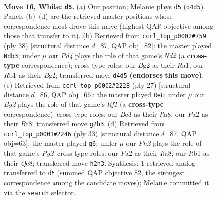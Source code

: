 \documentclass[11pt]{article}
\begin{document}
\clearpage

\begin{figure}[p]\centering
\begin{subfigure}{0.46\textwidth}\centering
\resizebox{\linewidth}{!}{%
\newchessgame
\chessboard[
  setfen={rnb1q1k1/pp2r1pp/2p1p3/4Np1n/2PP4/2B1P1P1/P4PBP/1R1QR1K1 w - - 1 16},
  showmover=false,
  pgfstyle=straightmove, color=movearrow, markmove={d4-d5}
]}
\caption{}
\end{subfigure}\hfill
\begin{subfigure}{0.46\textwidth}\centering
\resizebox{\linewidth}{!}{%
\newchessgame
\chessboard[
  setfen={rnbqr1k1/6pp/2p1pp2/p1N2n2/Pp1P4/6P1/2QNPPBP/R4RK1 w - - 8 20},
  showmover=false,
  pgfstyle=straightmove, color=movearrow, markmove={d2-b3}
]}
\caption{}
\end{subfigure}
\\[4pt]
\begin{subfigure}{0.46\textwidth}\centering
\resizebox{\linewidth}{!}{%
\newchessgame
\chessboard[
  setfen={r1bq1rk1/pp4bp/2ppp1p1/5p2/2PPn3/BP3NP1/P1Q1PPBP/R2R2K1 b - - 4 14},
  showmover=false,
  pgfstyle=straightmove, color=movearrow, markmove={f8-e8}
]}
\caption{}
\end{subfigure}\hfill
\begin{subfigure}{0.46\textwidth}\centering
\resizebox{\linewidth}{!}{%
\newchessgame
\chessboard[
  setfen={r1qr2k1/5ppp/p2pbn2/4p3/p3P3/1P1B1N2/P1P1QPPP/R1R3K1 b - - 0 17},
  showmover=false,
  pgfstyle=straightmove, color=movearrow, markmove={g7-g6}
]}
\caption{}
\end{subfigure}
\caption{\textbf{Move 16, White: \texttt{d5}.} (a) Our position; Melanie plays \texttt{d5} (\texttt{d4d5}). Panels (b)--(d) are the retrieved master positions whose correspondence most drove this move (highest QAP objective among those that transfer to it). (b) Retrieved from \texttt{ccrl\_top\_p0002\#759} (ply 38) [structural distance $d$=87, QAP obj=82]: the master played \texttt{Ndb3}; under $\mu$ our \emph{Pd4} plays the role of that game's \emph{Nd2} (a \textbf{cross-type} correspondence); cross-type roles: our \emph{B}g2 as their \emph{R}a1, our \emph{R}b1 as their \emph{B}g2; transferred move \texttt{d4d5} \textbf{(endorses this move)}. (c) Retrieved from \texttt{ccrl\_top\_p0002\#2228} (ply 27) [structural distance $d$=86, QAP obj=66]: the master played \texttt{Re8}; under $\mu$ our \emph{Bg2} plays the role of that game's \emph{Rf1} (a \textbf{cross-type} correspondence); cross-type roles: our \emph{B}c3 as their \emph{R}a8, our \emph{P}a2 as their \emph{B}c8; transferred move \texttt{g2h3}. (d) Retrieved from \texttt{ccrl\_top\_p0001\#2246} (ply 33) [structural distance $d$=87, QAP obj=63]: the master played \texttt{g6}; under $\mu$ our \emph{Ph2} plays the role of that game's \emph{Pg2}; cross-type roles: our \emph{P}a2 as their \emph{R}a8, our \emph{R}b1 as their \emph{Q}c8; transferred move \texttt{h2h3}. Synthesis: 1 retrieved analog transferred to \texttt{d5} (summed QAP objective 82, the strongest correspondence among the candidate moves); Melanie committed it via the \texttt{search} selector.}
\label{fig:thought-m30}
\end{figure}
\end{document}
